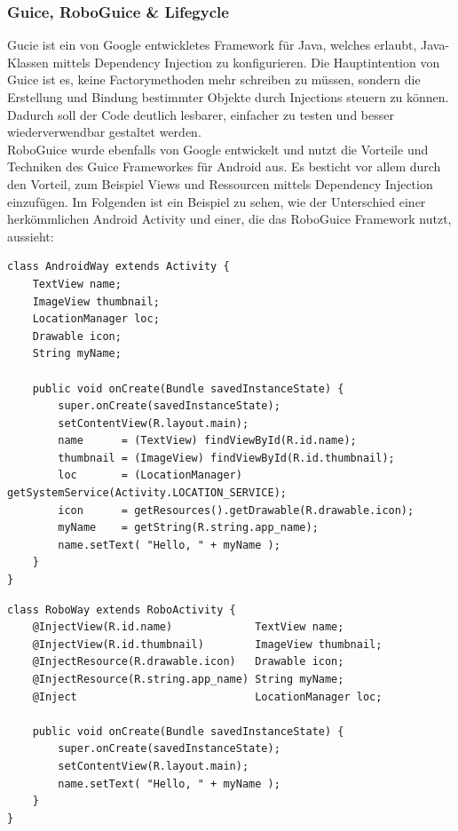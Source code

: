 \documentclass[a4paper,12pt]{article}
\begin{document}
\subsubsection{Guice, RoboGuice \& Lifegycle}
Gucie ist ein von Google entwickletes Framework für Java, welches erlaubt, Java-Klassen mittels Dependency Injection zu konfigurieren. Die Hauptintention von Guice ist es, keine Factorymethoden mehr schreiben zu müssen, sondern die Erstellung und Bindung bestimmter Objekte durch Injections steuern zu können. Dadurch soll der Code deutlich lesbarer, einfacher zu testen und besser wiederverwendbar gestaltet werden. \\
RoboGuice wurde ebenfalls von Google entwickelt und nutzt die Vorteile und Techniken des Guice Frameworkes für Android aus. Es besticht vor allem durch den Vorteil, zum Beispiel Views und Ressourcen mittels Dependency Injection einzufügen.  Im Folgenden ist ein Beispiel zu sehen, wie der Unterschied einer herkömmlichen Android Activity und einer, die das RoboGuice Framework nutzt, aussieht:\\
\lstset{language=Java}
\begin{lstlisting}[caption={Standard Android Activity \cite{roboguice-libaries} }]
    class AndroidWay extends Activity { 
    TextView name; 
    ImageView thumbnail; 
    LocationManager loc; 
    Drawable icon; 
    String myName; 

    public void onCreate(Bundle savedInstanceState) { 
        super.onCreate(savedInstanceState); 
        setContentView(R.layout.main);
        name      = (TextView) findViewById(R.id.name); 
        thumbnail = (ImageView) findViewById(R.id.thumbnail); 
        loc       = (LocationManager) getSystemService(Activity.LOCATION_SERVICE); 
        icon      = getResources().getDrawable(R.drawable.icon); 
        myName    = getString(R.string.app_name); 
        name.setText( "Hello, " + myName ); 
    } 
} 
\end{lstlisting}
\lstset{language=Java}
\begin{lstlisting}[caption={Android Activity mit RoboGuice \cite{roboguice-libaries}}]
   class RoboWay extends RoboActivity { 
    @InjectView(R.id.name)             TextView name; 
    @InjectView(R.id.thumbnail)        ImageView thumbnail; 
    @InjectResource(R.drawable.icon)   Drawable icon; 
    @InjectResource(R.string.app_name) String myName; 
    @Inject                            LocationManager loc; 

    public void onCreate(Bundle savedInstanceState) { 
        super.onCreate(savedInstanceState); 
        setContentView(R.layout.main);
        name.setText( "Hello, " + myName ); 
    } 
} 
\end{lstlisting}
\end{document}
